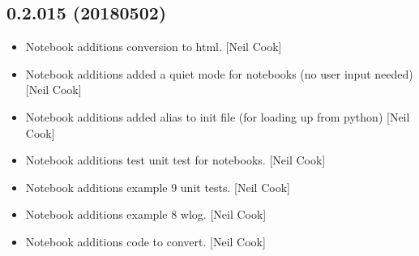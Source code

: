 \documentclass[a4paper,10pt,english]{report}
\begin{document}
\subsection{0.2.015 (2018\sphinxhyphen{}05\sphinxhyphen{}02)}
\label{\detokenize{misc/changelog:id465}}\begin{itemize}
\item {} 
Notebook additions \sphinxhyphen{} conversion to html. {[}Neil Cook{]}

\item {} 
Notebook additions \sphinxhyphen{} added a quiet mode for notebooks (no user input
needed) {[}Neil Cook{]}

\item {} 
Notebook additions \sphinxhyphen{} added  alias to init file (for loading
up from python) {[}Neil Cook{]}

\item {} 
Notebook additions \sphinxhyphen{} test unit test for notebooks. {[}Neil Cook{]}

\item {} 
Notebook additions \sphinxhyphen{} example 9 \sphinxhyphen{} unit tests. {[}Neil Cook{]}

\item {} 
Notebook additions \sphinxhyphen{} example 8 \sphinxhyphen{} wlog. {[}Neil Cook{]}

\item {} 
Notebook additions \sphinxhyphen{} code to convert. {[}Neil Cook{]}

\end{itemize}
\end{document}
